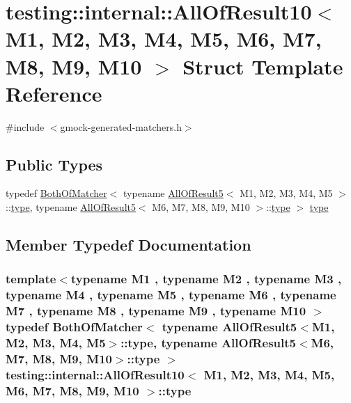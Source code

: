 \hypertarget{structtesting_1_1internal_1_1_all_of_result10}{}\section{testing\+:\+:internal\+:\+:All\+Of\+Result10$<$ M1, M2, M3, M4, M5, M6, M7, M8, M9, M10 $>$ Struct Template Reference}
\label{structtesting_1_1internal_1_1_all_of_result10}


{\ttfamily \#include $<$gmock-\/generated-\/matchers.\+h$>$}

\subsection*{Public Types}
\begin{DoxyCompactItemize}
\item 
typedef \hyperlink{classtesting_1_1internal_1_1_both_of_matcher}{Both\+Of\+Matcher}$<$ typename \hyperlink{structtesting_1_1internal_1_1_all_of_result5}{All\+Of\+Result5}$<$ M1, M2, M3, M4, M5 $>$\+::\hyperlink{structtesting_1_1internal_1_1_all_of_result10_a48d6c6de6d0d5445b212119e1f536af5}{type}, typename \hyperlink{structtesting_1_1internal_1_1_all_of_result5}{All\+Of\+Result5}$<$ M6, M7, M8, M9, M10 $>$\+::\hyperlink{structtesting_1_1internal_1_1_all_of_result10_a48d6c6de6d0d5445b212119e1f536af5}{type} $>$ \hyperlink{structtesting_1_1internal_1_1_all_of_result10_a48d6c6de6d0d5445b212119e1f536af5}{type}
\end{DoxyCompactItemize}


\subsection{Member Typedef Documentation}
\subsubsection[{\texorpdfstring{type}{type}}]{\setlength{\rightskip}{0pt plus 5cm}template$<$typename M1 , typename M2 , typename M3 , typename M4 , typename M5 , typename M6 , typename M7 , typename M8 , typename M9 , typename M10 $>$ typedef {\bf Both\+Of\+Matcher}$<$ typename {\bf All\+Of\+Result5}$<$M1, M2, M3, M4, M5$>$\+::{\bf type}, typename {\bf All\+Of\+Result5}$<$M6, M7, M8, M9, M10$>$\+::{\bf type} $>$ {\bf testing\+::internal\+::\+All\+Of\+Result10}$<$ M1, M2, M3, M4, M5, M6, M7, M8, M9, M10 $>$\+::{\bf type}}\hypertarget{structtesting_1_1internal_1_1_all_of_result10_a48d6c6de6d0d5445b212119e1f536af5}{}\label{structtesting_1_1internal_1_1_all_of_result10_a48d6c6de6d0d5445b212119e1f536af5}



